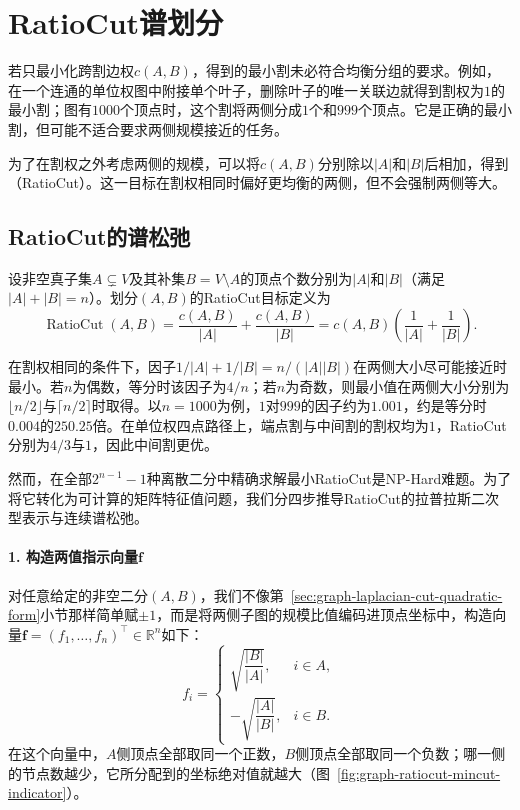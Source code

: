 \section{RatioCut谱划分}
\label{sec:graph-ratiocut}

若只最小化跨割边权$c(A,B)$，得到的最小割未必符合均衡分组的要求。例如，在一个连通的单位权图中附接单个叶子，删除叶子的唯一关联边就得到割权为$1$的最小割；图有$1000$个顶点时，这个割将两侧分成$1$个和$999$个顶点。它是正确的最小割，但可能不适合要求两侧规模接近的任务。

为了在割权之外考虑两侧的规模，可以将$c(A,B)$分别除以$|A|$和$|B|$后相加，得到（RatioCut）。这一目标在割权相同时偏好更均衡的两侧，但不会强制两侧等大。

\subsection{RatioCut的谱松弛}
\label{sec:graph-ratiocut-relaxation}

\begin{definition}[RatioCut目标]
\label{def:graph-ratiocut}
设非空真子集$A\subsetneq V$及其补集$B=V\setminus A$的顶点个数分别为$|A|$和$|B|$（满足$|A|+|B|=n$）。划分$(A,B)$的RatioCut目标定义为
\begin{equation}
\label{eq:graph-ratiocut}
\operatorname{RatioCut}(A,B)
=\frac{c(A,B)}{|A|}+\frac{c(A,B)}{|B|}
=c(A,B)\left(\frac{1}{|A|}+\frac{1}{|B|}\right).
\end{equation}
\end{definition}

在割权相同的条件下，因子$1/|A|+1/|B|=n/(|A||B|)$在两侧大小尽可能接近时最小。若$n$为偶数，等分时该因子为$4/n$；若$n$为奇数，则最小值在两侧大小分别为$\lfloor n/2\rfloor$与$\lceil n/2\rceil$时取得。以$n=1000$为例，$1$对$999$的因子约为$1.001$，约是等分时$0.004$的$250.25$倍。在单位权四点路径上，端点割与中间割的割权均为$1$，RatioCut分别为$4/3$与$1$，因此中间割更优。

然而，在全部$2^{n-1}-1$种离散二分中精确求解最小RatioCut是NP-Hard难题。为了将它转化为可计算的矩阵特征值问题，我们分四步推导RatioCut的拉普拉斯二次型表示与连续谱松弛。

\paragraph{1. 构造两值指示向量$\bm f$}

对任意给定的非空二分$(A,B)$，我们不像第~\ref{sec:graph-laplacian-cut-quadratic-form}小节那样简单赋$\pm 1$，而是将两侧子图的规模比值编码进顶点坐标中，构造向量$\bm f=(f_1,\ldots,f_n)^\top\in\mathbb R^n$如下：
\begin{equation}
\label{eq:ratiocut-indicator-vector}
  f_i = \begin{cases}
    \sqrt{\dfrac{|B|}{|A|}}, & i\in A,\\[10pt]
    -\sqrt{\dfrac{|A|}{|B|}}, & i\in B.
  \end{cases}
\end{equation}
在这个向量中，$A$侧顶点全部取同一个正数，$B$侧顶点全部取同一个负数；哪一侧的节点数越少，它所分配到的坐标绝对值就越大（图~\ref{fig:graph-ratiocut-mincut-indicator}）。

